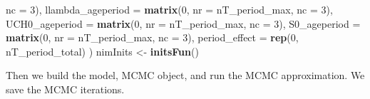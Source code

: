 \documentclass[11pt,]{article}
\newenvironment{Shaded}{\begin{snugshade}}{\end{snugshade}}
\newcommand{\KeywordTok}[1]{\textcolor[rgb]{0.13,0.29,0.53}{\textbf{#1}}}
\newcommand{\DataTypeTok}[1]{\textcolor[rgb]{0.13,0.29,0.53}{#1}}
\newcommand{\DecValTok}[1]{\textcolor[rgb]{0.00,0.00,0.81}{#1}}
\newcommand{\StringTok}[1]{\textcolor[rgb]{0.31,0.60,0.02}{#1}}
\newcommand{\NormalTok}[1]{#1}
\begin{document}
\begin{Shaded}
\begin{Highlighting}[]
                                             \DataTypeTok{nc =} \DecValTok{3}\NormalTok{),}
                          \DataTypeTok{llambda_ageperiod =} \KeywordTok{matrix}\NormalTok{(}\DecValTok{0}\NormalTok{,}
                                                     \DataTypeTok{nr =}\NormalTok{ nT_period_max,}
                                                     \DataTypeTok{nc =} \DecValTok{3}\NormalTok{),}
                          \DataTypeTok{UCH0_ageperiod =} \KeywordTok{matrix}\NormalTok{(}\DecValTok{0}\NormalTok{,}
                                                  \DataTypeTok{nr =}\NormalTok{ nT_period_max,}
                                                  \DataTypeTok{nc =} \DecValTok{3}\NormalTok{),}
                          \DataTypeTok{S0_ageperiod =} \KeywordTok{matrix}\NormalTok{(}\DecValTok{0}\NormalTok{,}
                                                \DataTypeTok{nr =}\NormalTok{ nT_period_max,}
                                                \DataTypeTok{nc =} \DecValTok{3}\NormalTok{),}
                          \DataTypeTok{period_effect =} \KeywordTok{rep}\NormalTok{(}\DecValTok{0}\NormalTok{, nT_period_total)}
\NormalTok{                          )}
\NormalTok{nimInits <-}\StringTok{ }\KeywordTok{initsFun}\NormalTok{()}
\end{Highlighting}
\end{Shaded}

Then we build the model, MCMC object, and run the MCMC approximation. We
save the MCMC iterations.
\end{document}
